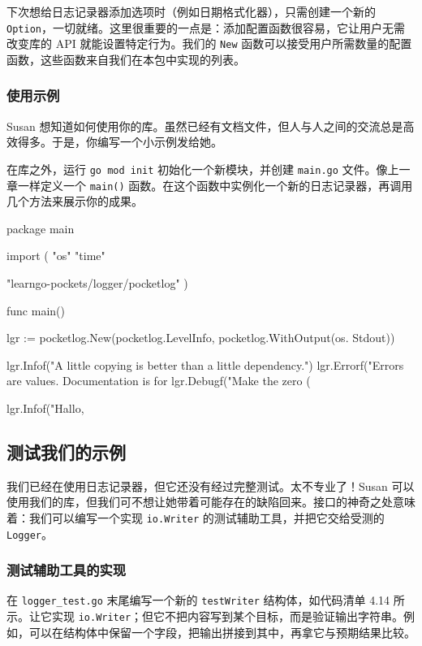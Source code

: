 下次想给日志记录器添加选项时（例如日期格式化器），只需创建一个新的 \texttt{Option}，一切就绪。这里很重要的一点是：添加配置函数很容易，它让用户无需改变库的 API 就能设置特定行为。我们的 \texttt{New} 函数可以接受用户所需数量的配置函数，这些函数来自我们在本包中实现的列表。

\subsubsection*{使用示例}

Susan 想知道如何使用你的库。虽然已经有文档文件，但人与人之间的交流总是高效得多。于是，你编写一个小示例发给她。

在库之外，运行 \texttt{go mod init} 初始化一个新模块，并创建 \texttt{main.go} 文件。像上一
章一样定义一个 \texttt{main()} 函数。在这个函数中实例化一个新的日志记录器，再调用几个方法来展示你的成果。

\begin{gocode}[title={代码清单 4.13 main.go：使用示例}]
package main

import (
    "os"
    "time"

    "learngo-pockets/logger/pocketlog"
)

func main() {
    lgr := pocketlog.New(pocketlog.LevelInfo, pocketlog.WithOutput(os.
        Stdout))

    lgr.Infof("A little copying is better than a little dependency.")
    lgr.Errorf("Errors are values. Documentation is for %
    lgr.Debugf("Make the zero (%

    lgr.Infof("Hallo, %
}
\end{gocode}

\subsection{测试我们的示例}

我们已经在使用日志记录器，但它还没有经过完整测试。太不专业了！Susan 可以使用我们的库，但我们可不想让她带着可能存在的缺陷回来。接口的神奇之处意味着：我们可以编写一个实现 \texttt{io.Writer} 的测试辅助工具，并把它交给受测的 \texttt{Logger}。

\subsubsection*{测试辅助工具的实现}

在 \texttt{logger\_test.go} 末尾编写一个新的 \texttt{testWriter} 结构体，如代码清单 4.14 所示。让它实现 \texttt{io.Writer}；但它不把内容写到某个目标，而是验证输出字符串。例如，可以在结构体中保留一个字段，把输出拼接到其中，再拿它与预期结果比较。

